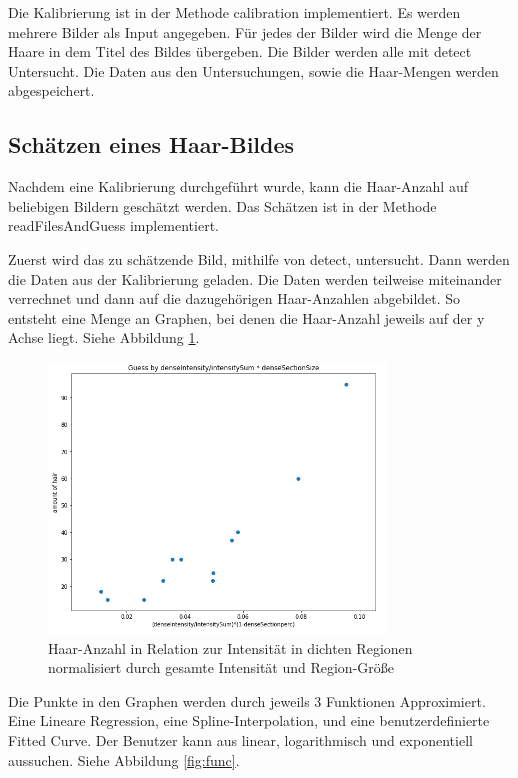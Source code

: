\documentclass[german,a4paper, 12pt]{llncs}
\begin{document}
Die Kalibrierung ist in der Methode calibration implementiert.
Es werden mehrere Bilder als Input angegeben. Für jedes der Bilder wird die Menge der Haare in dem Titel des Bildes übergeben. 
Die Bilder werden alle mit detect Untersucht. Die Daten aus den Untersuchungen, sowie die Haar-Mengen werden abgespeichert.

\subsection{Schätzen eines Haar-Bildes}

Nachdem eine Kalibrierung durchgeführt wurde, kann die Haar-Anzahl auf beliebigen Bildern geschätzt werden.
Das Schätzen ist in der Methode readFilesAndGuess implementiert.

Zuerst wird das zu schätzende Bild, mithilfe von detect, untersucht.
Dann werden die Daten aus der Kalibrierung geladen. 
Die Daten werden teilweise miteinander verrechnet und dann auf die dazugehörigen Haar-Anzahlen abgebildet.
So entsteht eine Menge an Graphen, bei denen die Haar-Anzahl jeweils auf der y Achse liegt. Siehe Abbildung \ref{fig:mapping}. 

\begin{figure}
	\centering
	\includegraphics[width=0.8\textwidth]{fig64/gh4.PNG}
	\caption[]{Haar-Anzahl in Relation zur Intensität in dichten Regionen normalisiert durch gesamte Intensität und Region-Größe}
	\label{fig:mapping}
\end{figure}

Die Punkte in den Graphen werden durch jeweils 3 Funktionen Approximiert. Eine Lineare Regression, eine Spline-Interpolation, und eine benutzerdefinierte Fitted Curve.
Der Benutzer kann aus linear, logarithmisch und exponentiell aussuchen.
Siehe Abbildung \ref{fig:func}.
\end{document}
